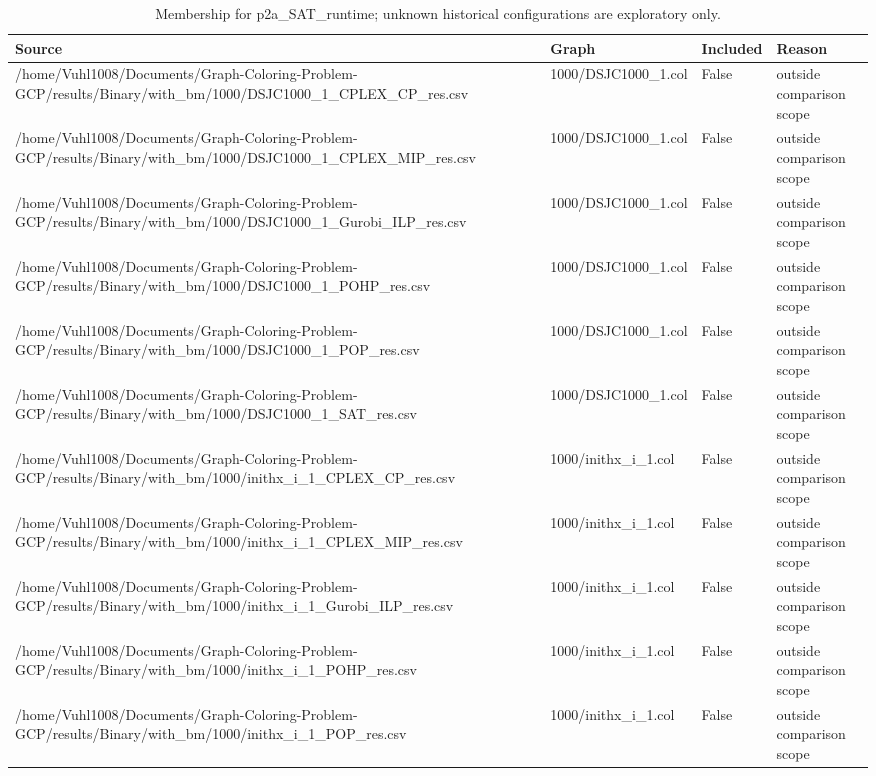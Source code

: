 \begin{table}[htbp]
\centering
\caption{Membership for p2a\_SAT\_runtime; unknown historical configurations are exploratory only.}
\label{tab:p2a-SAT-runtime-membership}
\begin{tabular}{llll}
\hline
Source & Graph & Included & Reason \\
\hline
/home/Vuhl1008/Documents/Graph-Coloring-Problem-GCP/results/Binary/with\_bm/1000/DSJC1000\_1\_CPLEX\_CP\_res.csv & 1000/DSJC1000\_1.col & False & outside comparison scope \\
/home/Vuhl1008/Documents/Graph-Coloring-Problem-GCP/results/Binary/with\_bm/1000/DSJC1000\_1\_CPLEX\_MIP\_res.csv & 1000/DSJC1000\_1.col & False & outside comparison scope \\
/home/Vuhl1008/Documents/Graph-Coloring-Problem-GCP/results/Binary/with\_bm/1000/DSJC1000\_1\_Gurobi\_ILP\_res.csv & 1000/DSJC1000\_1.col & False & outside comparison scope \\
/home/Vuhl1008/Documents/Graph-Coloring-Problem-GCP/results/Binary/with\_bm/1000/DSJC1000\_1\_POHP\_res.csv & 1000/DSJC1000\_1.col & False & outside comparison scope \\
/home/Vuhl1008/Documents/Graph-Coloring-Problem-GCP/results/Binary/with\_bm/1000/DSJC1000\_1\_POP\_res.csv & 1000/DSJC1000\_1.col & False & outside comparison scope \\
/home/Vuhl1008/Documents/Graph-Coloring-Problem-GCP/results/Binary/with\_bm/1000/DSJC1000\_1\_SAT\_res.csv & 1000/DSJC1000\_1.col & False & outside comparison scope \\
/home/Vuhl1008/Documents/Graph-Coloring-Problem-GCP/results/Binary/with\_bm/1000/inithx\_i\_1\_CPLEX\_CP\_res.csv & 1000/inithx\_i\_1.col & False & outside comparison scope \\
/home/Vuhl1008/Documents/Graph-Coloring-Problem-GCP/results/Binary/with\_bm/1000/inithx\_i\_1\_CPLEX\_MIP\_res.csv & 1000/inithx\_i\_1.col & False & outside comparison scope \\
/home/Vuhl1008/Documents/Graph-Coloring-Problem-GCP/results/Binary/with\_bm/1000/inithx\_i\_1\_Gurobi\_ILP\_res.csv & 1000/inithx\_i\_1.col & False & outside comparison scope \\
/home/Vuhl1008/Documents/Graph-Coloring-Problem-GCP/results/Binary/with\_bm/1000/inithx\_i\_1\_POHP\_res.csv & 1000/inithx\_i\_1.col & False & outside comparison scope \\
/home/Vuhl1008/Documents/Graph-Coloring-Problem-GCP/results/Binary/with\_bm/1000/inithx\_i\_1\_POP\_res.csv & 1000/inithx\_i\_1.col & False & outside comparison scope \\

\end{tabular}
\end{table}
